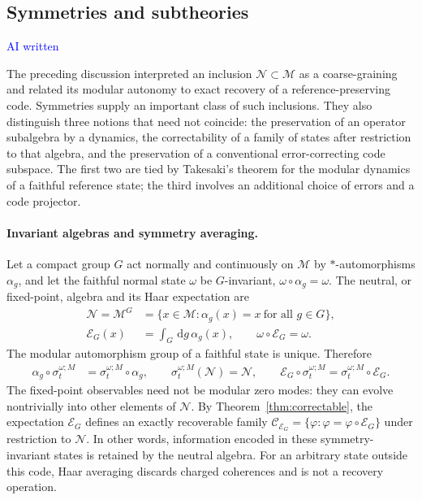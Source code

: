 \documentclass[a4paper,11pt]{article}
\theoremstyle{definition}
\newcommand{\dd}{\,\mathrm{d}}
\newcommand{\mN}{\mathcal{N}}
\newcommand{\mM}{\mathcal{M}}
\newcommand{\NL}[1]{\textcolor{blue}{#1}}
\newcommand{\mE}{\mathcal{E}}
\begin{document}
\subsection{Symmetries and subtheories}\label{subsec:symmetries-QEC-subtheories}

\NL{AI written}

The preceding discussion interpreted an inclusion $\mN\subset\mM$ as a
coarse-graining and related its modular autonomy to exact recovery of a
reference-preserving code. Symmetries supply an important class of such
inclusions. They also distinguish three notions that need not coincide:
the preservation of an operator subalgebra by a dynamics, the correctability
of a family of states after restriction to that algebra, and the preservation
of a conventional error-correcting code subspace. The first two are tied by
Takesaki's theorem for the modular dynamics of a faithful reference state;
the third involves an additional choice of errors and a code projector.

\paragraph{Invariant algebras and symmetry averaging.}
Let a compact group $G$ act normally and continuously on $\mM$ by
$*$-automorphisms $\alpha_g$, and let the faithful normal state $\omega$
be $G$-invariant, $\omega\circ\alpha_g=\omega$. The neutral, or
fixed-point, algebra and its Haar expectation are
\begin{align}
 \mN=\mM^G
 &=\{x\in\mM:\alpha_g(x)=x\ \text{for all }g\in G\},\nonumber\\
 \mE_G(x)&=\int_G\!\dd g\,\alpha_g(x),
 \qquad \omega\circ\mE_G=\omega .
 \label{eq:symmetry-Haar-expectation}
\end{align}
The modular automorphism group of a faithful state is unique. Therefore
\begin{align}
 \alpha_g\circ\sigma_t^{\omega;M}
 &=\sigma_t^{\omega;M}\circ\alpha_g,
 \qquad
 \sigma_t^{\omega;M}(\mN)=\mN,
 \qquad
 \mE_G\circ\sigma_t^{\omega;M}
 =\sigma_t^{\omega;M}\circ\mE_G .
 \label{eq:symmetry-modular-intertwining}
\end{align}
The fixed-point observables need not be modular zero modes: they can evolve
nontrivially into other elements of $\mN$. By Theorem~\ref{thm:correctable},
the expectation $\mE_G$ defines an exactly recoverable family
$\mathcal C_{\mE_G}=\{\varphi:\varphi=\varphi\circ\mE_G\}$ under
restriction to $\mN$. In other words, information encoded in these
symmetry-invariant states is retained by the neutral algebra. For an
arbitrary state outside this code, Haar averaging discards charged
coherences and is not a recovery operation.
\end{document}
